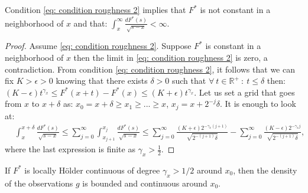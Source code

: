 \begin{lemma}\label{lemma: finite g if rough 2}
    Condition \eqref{eq: condition roughness 2} implies that $F^*$ is not constant in a neighborhood of  $x$ and that: $ \int_{x}^{\infty} \frac{dF^*(s)}{\sqrt{s - x}}  < \infty.$
\end{lemma}
\begin{proof}
Assume \eqref{eq: condition roughness 2}. Suppose $F^*$ is constant in a neighborhood of  $x$ then the limit in \eqref{eq: condition roughness 2} is zero, a contradiction. From condition \eqref{eq: condition roughness 2}, it follows that we can fix $K > \epsilon > 0$ knowing that there exists $\delta >0$ such that $\forall \: t \in \mathbb{R}^{+} \: : \: t \leq \delta$ then: $(K - \epsilon) t^{\gamma_x} \leq F^*(x + t) - F^*(x) \leq (K+\epsilon) t^{\gamma_x}$. Let us set a grid that goes from $x$ to $x + \delta$ as: $x_0 = x + \delta \geq x_1 \geq ... \geq x$, $x_j = x + 2^{-j} \delta$. It is enough to look at:
\begin{align*}
    &\int_{x}^{x+\delta} \frac{dF^*(s)}{\sqrt{s-x}} \leq \sum_{j=0}^{\infty} \int_{x_{j+1}}^{x_j} \frac{dF^*(s)}{\sqrt{s-x}} \leq \sum_{j=0}^{\infty} \frac{(K+\epsilon)2^{-\gamma_x(j+1)}}{\sqrt{2^{-(j+1)}\delta}} - \sum_{j=0}^{\infty} \frac{(K-\epsilon)2^{-\gamma_xj}}{\sqrt{2^{-(j+1)}\delta}},
\end{align*}
where the last expression is finite as $\gamma_x> \frac{1}{2}$.
\end{proof}
\begin{lemma}\label{lemma: bounded density}
If $F^*$ is locally Hölder continuous of degree $\gamma_x> 1/2$ around $x_0$, then the density of the observations $g$ is bounded and continuous around $x_0$.
\end{lemma}

